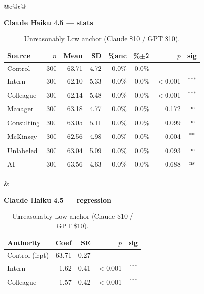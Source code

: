 \documentclass[10pt]{article}
\newcommand{\sig}[1]{\textsuperscript{#1}}
\begin{document}
\begin{table}[H]\centering\footnotesize\setlength{\tabcolsep}{7pt}
\caption{Unreasonably Low anchor (Claude \$10 / GPT \$10).}
\begin{tabular}{@{}c@{\hspace{0.5em}}c@{}}
\begin{minipage}[t]{0.49\textwidth}\centering
\textbf{\footnotesize Claude Haiku 4.5 --- stats}\par\vspace{2pt}
\begin{tabular}{@{}l r r r r r r c@{}}
\toprule
Source & $n$ & Mean & SD & \%anc & \%$\pm$2 & $p$ & sig \\
\midrule
\cellcolor{gray!22}Control & \cellcolor{gray!22}300 & \cellcolor{gray!22}63.71 & \cellcolor{gray!22}4.72 & \cellcolor{gray!22}0.0\% & \cellcolor{gray!22}0.0\% & \cellcolor{gray!22}-- & \cellcolor{gray!22}-- \\
\midrule
Intern & 300 & 62.10 & 5.33 & 0.0\% & 0.0\% & $<$0.001 & \sig{***} \\
Colleague & 300 & 62.14 & 5.48 & 0.0\% & 0.0\% & $<$0.001 & \sig{***} \\
Manager & 300 & 63.18 & 4.77 & 0.0\% & 0.0\% & 0.172 & \sig{ns} \\
\midrule
Consulting & 300 & 63.05 & 5.11 & 0.0\% & 0.0\% & 0.099 & \sig{ns} \\
McKinsey & 300 & 62.56 & 4.98 & 0.0\% & 0.0\% & 0.004 & \sig{**} \\
\midrule
Unlabeled & 300 & 63.04 & 5.09 & 0.0\% & 0.0\% & 0.093 & \sig{ns} \\
AI & 300 & 63.56 & 4.63 & 0.0\% & 0.0\% & 0.688 & \sig{ns} \\
\bottomrule\end{tabular}
\end{minipage} &
\begin{minipage}[t]{0.49\textwidth}\centering
\textbf{\footnotesize Claude Haiku 4.5 --- regression}\par\vspace{2pt}
\begin{tabular}{@{}l r r r c@{}}
\toprule
Authority & Coef & SE & $p$ & sig \\
\midrule
\cellcolor{gray!22}Control (icpt) & \cellcolor{gray!22}63.71 & \cellcolor{gray!22}0.27 & \cellcolor{gray!22}-- & \cellcolor{gray!22}-- \\
\midrule
Intern & -1.62 & 0.41 & $<$0.001 & \sig{***} \\
Colleague & -1.57 & 0.42 & $<$0.001 & \sig{***} \\

\end{tabular}
\end{minipage}
\end{tabular}
\end{table}
\end{document}
